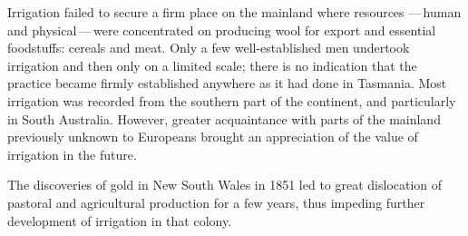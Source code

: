 \closure Irrigation failed to secure a firm place on the mainland
where resources ---\,human and physical\,---\,were concentrated on
producing wool for export and essential foodstuffs:
cereals and meat.  Only a few well-established men
undertook irrigation and then only on a limited scale; there is no
indication that the practice became firmly established anywhere as it
had done in Tasmania.  Most irrigation was recorded from the southern
part of the continent, and particularly in South Australia.  However,
greater acquaintance with parts of the mainland previously unknown to
Europeans brought an appreciation of the value of irrigation in the
future.

The discoveries of gold in New South Wales in 1851 led to great
dislocation of pastoral and agricultural production for a few years,
thus impeding further development of irrigation in that colony.

